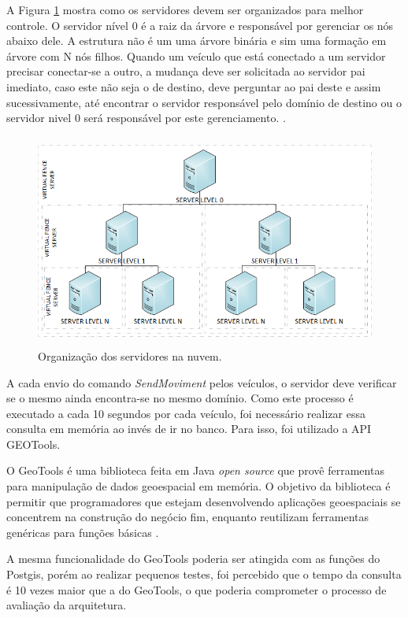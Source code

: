 \documentclass[
	12pt,				%
	oneside,			%
	a4paper,			%
	english,			%
	brazil				%
	]{abntex2ppgsi}
\begin{document}
A Figura \ref{fig:dServidores} mostra como os servidores devem ser organizados para melhor controle. O servidor nível 0 é a raiz da árvore e responsável por gerenciar os nós abaixo dele. A estrutura não é um uma árvore binária e sim uma formação em árvore com N nós filhos. Quando um veículo que está conectado a um servidor precisar conectar-se a outro, a mudança deve ser solicitada ao servidor pai imediato, caso este não seja o de destino, deve perguntar ao pai deste e assim sucessivamente, até encontrar o servidor responsável pelo domínio de destino ou o servidor nivel 0 será responsável por este gerenciamento.
.
\begin{figure}[h!]
	\centering
	\includegraphics [width=12cm,height=7cm] {images/servidores.png}
	\caption{Organização dos servidores na nuvem.}
	\label{fig:dServidores}
\end{figure}

A cada envio do comando \textit{SendMoviment} pelos veículos, o servidor deve verificar se o mesmo ainda encontra-se no mesmo domínio. Como este processo é executado a cada 10 segundos por cada veículo, foi necessário realizar essa consulta em memória ao invés de ir no banco. Para isso, foi utilizado a API GEOTools.

O GeoTools é uma biblioteca feita em Java \textit{open source} que provê ferramentas para manipulação de dados geoespacial em memória. O objetivo da biblioteca é permitir que programadores que estejam desenvolvendo aplicações geoespaciais se concentrem na construção do negócio fim, enquanto reutilizam ferramentas genéricas para funções básicas \cite{hall2008open}.

A mesma funcionalidade do GeoTools poderia ser atingida com as funções do Postgis, porém ao realizar pequenos testes, foi percebido que o tempo da consulta é 10 vezes maior que a do GeoTools, o que poderia comprometer o processo de avaliação da arquitetura.
\end{document}
